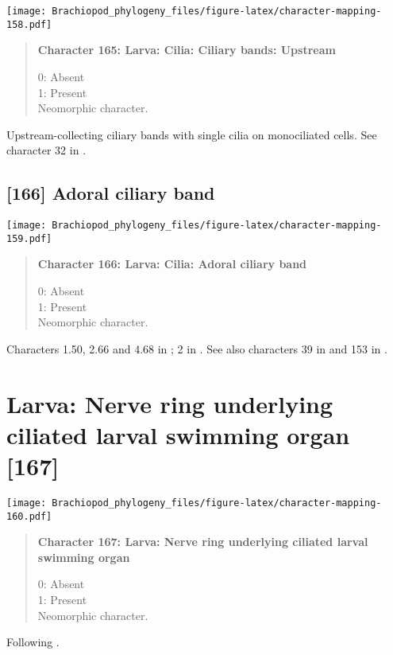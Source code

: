 \documentclass[openany]{book}
\theoremstyle{definition}
\theoremstyle{definition}
\theoremstyle{definition}
\theoremstyle{remark}
\begin{document}
\texttt{[image: Brachiopod\_phylogeny\_files/figure-latex/character-mapping-158.pdf]}

\begin{quote}
\textbf{Character 165: Larva: Cilia: Ciliary bands: Upstream}

0: Absent\\
1: Present\\
Neomorphic character.
\end{quote}

Upstream-collecting ciliary bands with single cilia on monociliated
cells. See character 32 in \citet{Glenner2004}.

\subsection*{{[}166{]} Adoral ciliary band}\label{adoral-ciliary-band}

\texttt{[image: Brachiopod\_phylogeny\_files/figure-latex/character-mapping-159.pdf]}

\begin{quote}
\textbf{Character 166: Larva: Cilia: Adoral ciliary band}

0: Absent\\
1: Present\\
Neomorphic character.
\end{quote}

Characters 1.50, 2.66 and 4.68 in \citet{SPS1996}; 2 in
\citet{Vinther2008}. See also characters 39 in \citet{Haszprunar1996}
and 153 in \citet{Giribet2002}.

\section{Larva: Nerve ring underlying ciliated larval swimming organ
{[}167{]}}\label{larva-nerve-ring-underlying-ciliated-larval-swimming-organ-167}

\texttt{[image: Brachiopod\_phylogeny\_files/figure-latex/character-mapping-160.pdf]}

\begin{quote}
\textbf{Character 167: Larva: Nerve ring underlying ciliated larval
swimming organ}

0: Absent\\
1: Present\\
Neomorphic character.
\end{quote}

Following \citet{Wanninger2009}.
\end{document}
